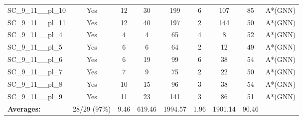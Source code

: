 \documentclass{article}
\begin{document}
\begin{tabular}{lcccccccc}
SC\_9\_11\_\_pl\_10 & Yes & 12 & 30 & 199 & 6 & 107 & 85 & A*(GNN) \\
SC\_9\_11\_\_pl\_11 & Yes & 12 & 40 & 197 & 2 & 144 & 50 & A*(GNN) \\
SC\_9\_11\_\_pl\_4 & Yes & 4 & 4 & 65 & 4 & 8 & 52 & A*(GNN) \\
SC\_9\_11\_\_pl\_5 & Yes & 6 & 6 & 64 & 2 & 12 & 49 & A*(GNN) \\
SC\_9\_11\_\_pl\_6 & Yes & 6 & 19 & 99 & 6 & 38 & 54 & A*(GNN) \\
SC\_9\_11\_\_pl\_7 & Yes & 7 & 9 & 75 & 2 & 22 & 50 & A*(GNN) \\
SC\_9\_11\_\_pl\_8 & Yes & 10 & 15 & 96 & 3 & 38 & 54 & A*(GNN) \\
SC\_9\_11\_\_pl\_9 & Yes & 11 & 23 & 141 & 3 & 86 & 51 & A*(GNN) \\
\textbf{Averages:} & 28/29 (97\%) & 9.46 & 619.46 & 1994.57 & 1.96 & 1901.14 & 90.46 & \\
\bottomrule
\end{tabular}
\\[0.7cm]
\end{document}
